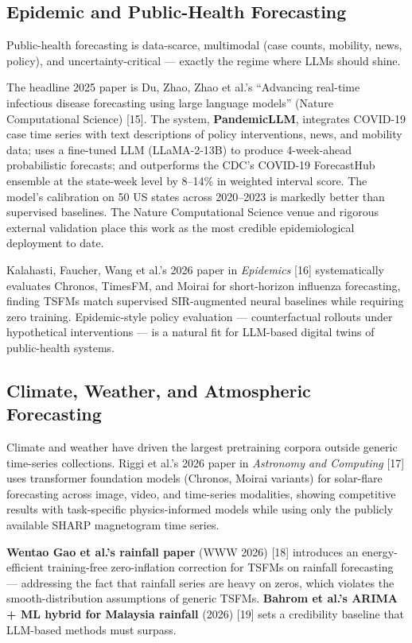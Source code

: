 \documentclass{article}
\begin{document}
\subsection{Epidemic and Public-Health Forecasting}\label{epidemic-and-public-health-forecasting}

Public-health forecasting is data-scarce, multimodal (case counts, mobility, news, policy), and uncertainty-critical --- exactly the regime where LLMs should shine.

The headline 2025 paper is Du, Zhao, Zhao et al.'s ``Advancing real-time infectious disease forecasting using large language models'' (Nature Computational Science) {[}15{]}. The system, \textbf{PandemicLLM}, integrates COVID-19 case time series with text descriptions of policy interventions, news, and mobility data; uses a fine-tuned LLM (LLaMA-2-13B) to produce 4-week-ahead probabilistic forecasts; and outperforms the CDC's COVID-19 ForecastHub ensemble at the state-week level by 8--14\% in weighted interval score. The model's calibration on 50 US states across 2020--2023 is markedly better than supervised baselines. The Nature Computational Science venue and rigorous external validation place this work as the most credible epidemiological deployment to date.

Kalahasti, Faucher, Wang et al.'s 2026 paper in \emph{Epidemics} {[}16{]} systematically evaluates Chronos, TimesFM, and Moirai for short-horizon influenza forecasting, finding TSFMs match supervised SIR-augmented neural baselines while requiring zero training. Epidemic-style policy evaluation --- counterfactual rollouts under hypothetical interventions --- is a natural fit for LLM-based digital twins of public-health systems.

\subsection{Climate, Weather, and Atmospheric Forecasting}\label{climate-weather-and-atmospheric-forecasting}

Climate and weather have driven the largest pretraining corpora outside generic time-series collections. Riggi et al.'s 2026 paper in \emph{Astronomy and Computing} {[}17{]} uses transformer foundation models (Chronos, Moirai variants) for solar-flare forecasting across image, video, and time-series modalities, showing competitive results with task-specific physics-informed models while using only the publicly available SHARP magnetogram time series.

\textbf{Wentao Gao et al.'s rainfall paper} (WWW 2026) {[}18{]} introduces an energy-efficient training-free zero-inflation correction for TSFMs on rainfall forecasting --- addressing the fact that rainfall series are heavy on zeros, which violates the smooth-distribution assumptions of generic TSFMs. \textbf{Bahrom et al.'s ARIMA + ML hybrid for Malaysia rainfall} (2026) {[}19{]} sets a credibility baseline that LLM-based methods must surpass.
\end{document}
